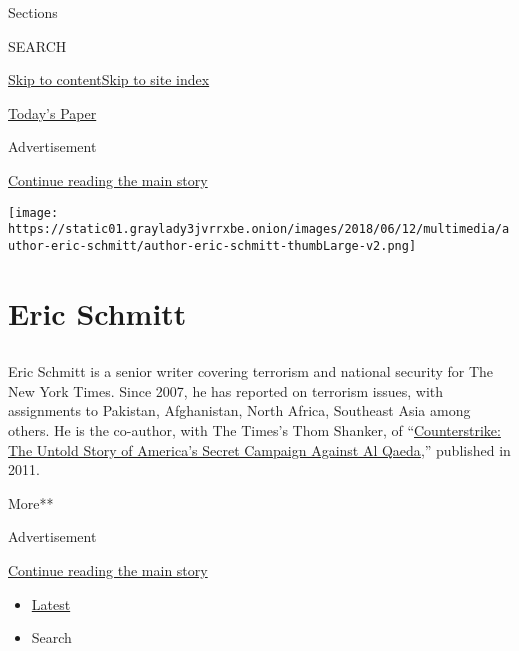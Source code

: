Sections

SEARCH

\protect\hyperlink{site-content}{Skip to
content}\protect\hyperlink{site-index}{Skip to site index}

\href{https://myaccount.nytimes3xbfgragh.onion/auth/login?response_type=cookie\&client_id=vi}{}

\href{https://www.nytimes3xbfgragh.onion/section/todayspaper}{Today's
Paper}

Advertisement

\protect\hyperlink{after-top}{Continue reading the main story}

\texttt{[image: https://static01.graylady3jvrrxbe.onion/images/2018/06/12/multimedia/author-eric-schmitt/author-eric-schmitt-thumbLarge-v2.png]}

\hypertarget{eric-schmitt}{%
\section{Eric Schmitt}\label{eric-schmitt}}

\subsection{}

Eric Schmitt is a senior writer covering terrorism and national security
for The New York Times. Since 2007, he has reported on terrorism issues,
with assignments to Pakistan, Afghanistan, North Africa, Southeast Asia
among others. He is the co-author, with The Times's Thom Shanker, of
``\href{http://www.counterstrikethebook.com/index.html}{Counterstrike:
The Untold Story of America's Secret Campaign Against Al Qaeda},''
published in 2011.

More**

Advertisement

\protect\hyperlink{after-mid1}{Continue reading the main story}

\begin{itemize}
\tightlist
\item
  \protect\hyperlink{stream-panel}{Latest}
\item
  Search
\end{itemize}


